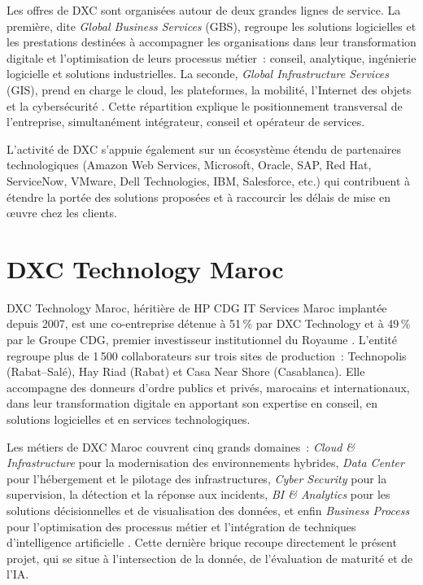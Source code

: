 \documentclass[12pt,a4paper]{report}
\begin{document}
Les offres de DXC sont organisées autour de deux grandes lignes de service. La première, dite \textit{Global Business Services} (GBS), regroupe les solutions logicielles et les prestations destinées à accompagner les organisations dans leur transformation digitale et l'optimisation de leurs processus métier~: conseil, analytique, ingénierie logicielle et solutions industrielles. La seconde, \textit{Global Infrastructure Services} (GIS), prend en charge le cloud, les plateformes, la mobilité, l'Internet des objets et la cybersécurité \cite{dxcorg}. Cette répartition explique le positionnement transversal de l'entreprise, simultanément intégrateur, conseil et opérateur de services.

L'activité de DXC s'appuie également sur un écosystème étendu de partenaires technologiques (Amazon Web Services, Microsoft, Oracle, SAP, Red Hat, ServiceNow, VMware, Dell Technologies, IBM, Salesforce, etc.) qui contribuent à étendre la portée des solutions proposées et à raccourcir les délais de mise en œuvre chez les clients.

\section{DXC Technology Maroc}
DXC Technology Maroc, héritière de HP CDG IT Services Maroc implantée depuis 2007, est une co-entreprise détenue à 51\,\% par DXC Technology et à 49\,\% par le Groupe CDG, premier investisseur institutionnel du Royaume \cite{dxcorg}. L'entité regroupe plus de 1\,500 collaborateurs sur trois sites de production~: Technopolis (Rabat--Salé), Hay Riad (Rabat) et Casa Near Shore (Casablanca). Elle accompagne des donneurs d'ordre publics et privés, marocains et internationaux, dans leur transformation digitale en apportant son expertise en conseil, en solutions logicielles et en services technologiques.

Les métiers de DXC Maroc couvrent cinq grands domaines~: \textit{Cloud \& Infrastructure} pour la modernisation des environnements hybrides, \textit{Data Center} pour l'hébergement et le pilotage des infrastructures, \textit{Cyber Security} pour la supervision, la détection et la réponse aux incidents, \textit{BI \& Analytics} pour les solutions décisionnelles et de visualisation des données, et enfin \textit{Business Process} pour l'optimisation des processus métier et l'intégration de techniques d'intelligence artificielle \cite{dxcorg}. Cette dernière brique recoupe directement le présent projet, qui se situe à l'intersection de la donnée, de l'évaluation de maturité et de l'IA.
\end{document}
